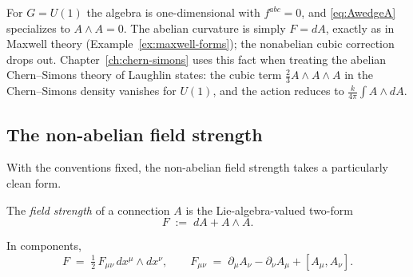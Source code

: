 
\begin{remark}\label{rem:abelian-case}
For $G = U(1)$ the algebra is one-dimensional with $f^{abc} = 0$, and \eqref{eq:AwedgeA} specializes to $A \wedge A = 0$. The abelian curvature is simply $F = dA$, exactly as in Maxwell theory (Example~\ref{ex:maxwell-forms}); the nonabelian cubic correction drops out. Chapter~\ref{ch:chern-simons} uses this fact when treating the abelian Chern--Simons theory of Laughlin states: the cubic term $A\wedge A\wedge A$ in the Chern--Simons density vanishes for $U(1)$, and the action reduces to $\int A\wedge dA$.
\end{remark}

\subsection{The non-abelian field strength}

With the conventions fixed, the non-abelian field strength takes a particularly clean form.

\begin{definition}\label{def:F-nonabelian}
The \emph{field strength} of a connection $A$ is the Lie-algebra-valued two-form
\begin{equation}\label{eq:F-nonabelian-def}
F \;:=\; dA + A \wedge A.
\end{equation}
\end{definition}

\begin{proposition}\label{prop:F-components}
In components,
\begin{equation}\label{eq:F-nonabelian-components}
F \;=\; \tfrac{1}{2}\,F_{\mu\nu}\, dx^\mu \wedge dx^\nu,
\qquad
F_{\mu\nu} \;=\; \partial_\mu A_\nu - \partial_\nu A_\mu + [A_\mu, A_\nu].
\end{equation}
\end{proposition}

